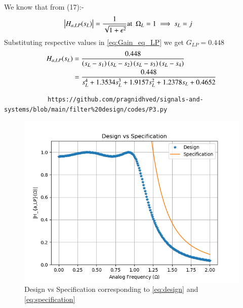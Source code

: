 \documentclass{article}
\begin{document}
\begin{enumerate}
		We know that from (17):-
		\begin{align}
			\left\vert H_{a,LP}(s_L)\right\vert &= \frac{1}{\sqrt{1+\epsilon^2}} \text{at} \hspace{5pt} \Omega_{L}=1 \implies s_{L} = j \label{eq:Gain_eq_LP} 
		\end{align}
		Substituting respective values in \eqref{eq:Gain_eq_LP} we get $G_{LP}=0.448$
		\begin{align}
			H_{a,LP}(s_L) &= \frac{0.448}{\left(s_L-s_1\right)\left(s_L-s_2\right)\left(s_L-s_3\right)\left(s_L-s_4\right)}\\
			&= \frac{0.448}{s_{L}^4 + 1.3534s_L^3 + 1.9157s_L^2 + 1.2378s_L + 0.4652}\label{eq:design}
		\end{align}
		\begin{lstlisting}
			https://github.com/pragnidhved/signals-and-systems/blob/main/filter%20design/codes/P3.py
		\end{lstlisting}
		\newpage
		\begin{figure}[htbp]
			\centering
			\includegraphics[width=1\linewidth]{figs/fig3}
			\caption{Design vs Specification corresponding to \eqref{eq:design} and \eqref{eq:specification}}
			\label{fig:design_vs_specf}
		\end{figure}
		

\end{enumerate}
\end{document}
